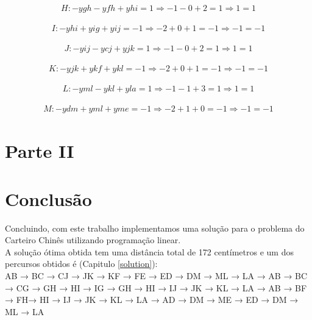 \documentclass[a4paper]{report}
\begin{document}
\begin{multline}
H: - ygh - yfh + yhi = 1
\Rightarrow - 1 - 0 + 2 = 1
\Rightarrow 1 = 1
\end{multline}

\begin{multline}
I: - yhi + yig + yij = -1
\Rightarrow - 2 + 0 + 1 = -1
\Rightarrow -1 = -1
\end{multline}

\begin{multline}
J: - yij - ycj + yjk = 1
\Rightarrow - 1 - 0 + 2 = 1
\Rightarrow 1 = 1
\end{multline}

\begin{multline}
K: - yjk + ykf + ykl = -1
\Rightarrow - 2 + 0 + 1 = -1
\Rightarrow -1 = -1
\end{multline}

\begin{multline}
L: - yml - ykl + yla = 1
\Rightarrow - 1 - 1 + 3 = 1
\Rightarrow 1 = 1
\end{multline}

\begin{multline}
M: - ydm + yml + yme = -1
\Rightarrow - 2 + 1 + 0 = -1
\Rightarrow -1 = -1
\end{multline}


\chapter{Parte II}



\chapter{Conclusão}
Concluindo, com este trabalho implementamos uma solução para o problema do
Carteiro Chinês utilizando programação linear.\\
A solução ótima obtida tem uma distância total de 172 centímetros e um dos
percursos obtidos é (Capitulo \ref{solution}):\\
AB → BC → CJ → JK → KF → FE → ED → DM → ML → LA →
AB → BC → CG → GH → HI  → IG → GH → HI → IJ → JK  → KL  → LA →
AB → BF → FH→ HI  → IJ → JK  → KL  → LA →
AD → DM → ME → ED  → DM → ML → LA\\
\end{document}
